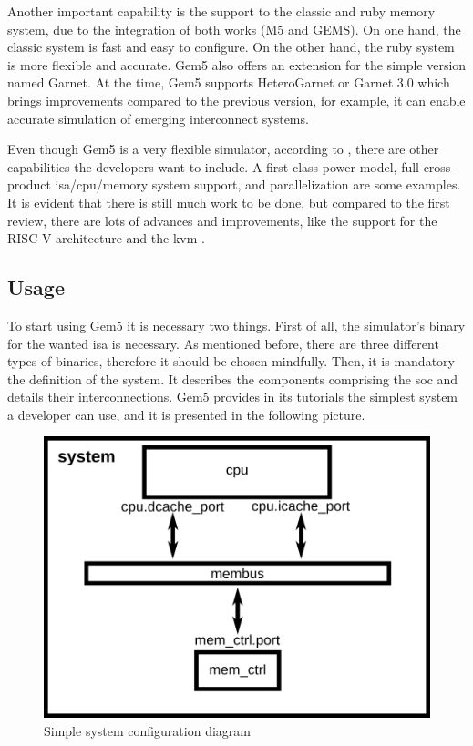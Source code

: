 Another important capability is the support to the classic and ruby memory system, due to the integration of both works (M5 and GEMS). On one 
hand, the classic system is fast and easy to configure. On the other hand, the ruby system is more flexible and accurate. Gem5 also offers an 
extension for the simple version named Garnet. At the time, Gem5 supports HeteroGarnet or Garnet 3.0 which brings improvements compared to the 
previous version, for example, it can enable accurate simulation of emerging interconnect systems. 


Even though Gem5 is a very flexible simulator, according to \cite{TheGem5Simulator}, there are other capabilities the developers want to 
include. A first-class power model, full cross-product \gls{isa}/\gls{cpu}/memory system support, and parallelization are some examples. 
It is evident that there is still much work to be done, but compared to the first review, there are lots of advances and improvements, like 
the support for the RISC-V architecture and the \gls{kvm} \cite{Thegem5simulatorV2}. 



\subsection{Usage}

To start using Gem5 it is necessary two things. First of all, the simulator's binary for the wanted \gls{isa} is necessary. As mentioned before, 
there are three different types of binaries, therefore it should be chosen mindfully. Then, it is mandatory the definition of the system. 
It describes the components comprising the \gls{soc} and details their interconnections. 
Gem5 provides in its tutorials the simplest system a developer can use, and it is presented in the following picture.

\begin{figure}[H]
	\centering
 	\includegraphics[width=0.5\linewidth]{Images/simple_config.png}
 	\caption{Simple system configuration diagram}
	 \label{fig_simple_config}
\end{figure}

